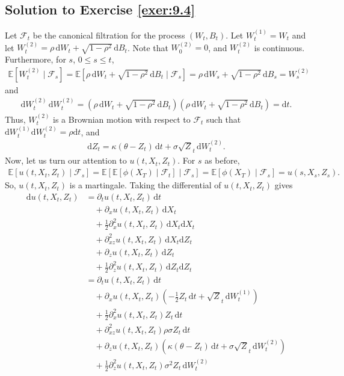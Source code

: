 \documentclass[12pt]{book}
\let\varphi\phi
\numberwithin{equation}{chapter}
\theoremstyle{plain}
\numberwithin{theorem}{section}
\theoremstyle{definition}
\numberwithin{exercise}{chapter}
\newcommand{\<}{\langle}
\renewcommand{\>}{\rangle}
\renewcommand{\(}{\left(}
\renewcommand{\)}{\right)}
\renewcommand{\[}{\left[}
\renewcommand{\]}{\right]}
\newcommand\Eb{\mathds{E}}
\newcommand\Fc{\mathscr{F}}
\newcommand\sig{\sigma}
\renewcommand\d{\partial}
\newcommand\dd{\mathrm{d}}
\newcommand\half{\frac{1}{2}}
\begin{document}
\subsection*{Solution to Exercise \ref{exer:9.4}}
Let $\Fc_t$ be the canonical filtration for the process $(W_t, B_t)$. Let $W_t^{(1)} = W_t$ and let $W_t^{(2)} = \rho \, \dd W_t + \sqrt{ 1 - \rho^2}\, \dd B_t$. Note that $W_0^{(2)} =0$, and $W_t^{(2)}$ is continuous. Furthermore, for $s$, $0 \leq s \leq t$, 
\begin{align}
\Eb[ W_t^{(2)} \mid \Fc_s]
	= \Eb[ \rho \, \dd W_t + \sqrt{ 1 - \rho^2}\, \dd B_t \mid \Fc_s]
	= \rho \, \dd W_s + \sqrt{ 1 - \rho^2}\, \dd B_s
	= W_s^{(2)}
\end{align}
and
\begin{align}
\dd W_t^{(2)}\, \dd W_t^{(2)}
	= \( \rho \, \dd W_t + \sqrt{ 1 - \rho^2}\, \dd B_t \) \(\rho \, \dd W_t + \sqrt{ 1 - \rho^2}\, \dd B_t\)
	= \dd t.
\end{align}
Thus, $W_t^{(2)}$ is a Brownian motion with respect to $\Fc_t$ such that $\dd W_t^{(1)}\dd W_t^{(2)} = \rho\dd t$, and 
\begin{align}
\dd Z_t
	= \kappa (\theta - Z_t)\, \dd t
	+ \sig \sqrt Z_t\, \dd W_t^{(2)}.
\end{align}
Now, let us turn our attention to $u(t,X_t,Z_t)$. For $s$ as before,
\begin{align}
\Eb[ u(t,X_t,Z_t) \mid \Fc_s]
	= \Eb[ \Eb[ \varphi(X_T) \mid \Fc_t] \mid \Fc_s]
	= \Eb[\varphi(X_T) \mid \Fc_s]
	= u(s,X_s,Z_s).
\end{align}
So, $u(t,X_t,Z_t)$ is a martingale. Taking the differential of $u(t,X_t, Z_t)$ gives
\begin{align}
\dd u(t,X_t, Z_t)
	&= \d_t u(t,X_t, Z_t)\, \dd t \\ &\quad
	  + \d_x u(t,X_t, Z_t)\, \dd X_t \\ &\quad
	  + \half \d_{x}^2 u(t,X_t, Z_t)\, \dd X_t \dd X_t \\ &\quad 
	  + \d_{xz}^2 u(t,X_t, Z_t)\, \dd X_t \dd Z_t \\ & \quad
	  + \d_z u(t,X_t, Z_t)\, \dd Z_t \\ & \quad
	  + \half \d_{z}^2 u(t,X_t, Z_t)\, \dd Z_t \dd Z_t \\
	&= \d_t u(t,X_t, Z_t)\, \dd t \\ &\quad
	  + \d_x u(t,X_t, Z_t)\( -\half Z_t \, \dd t + \sqrt Z_t\, \dd W_t^{(1)}\) \\ &\quad
	  + \half \d_{x}^2 u(t,X_t, Z_t) Z_t\, \dd t \\ &\quad 
	  + \d_{xz}^2 u(t,X_t, Z_t) \rho \sig Z_t\, \dd t \\ & \quad
	  + \d_z u(t,X_t, Z_t)\( \kappa (\theta - Z_t)\, \dd t + \sig \sqrt Z_t \, \dd W_t^{(2)}\) \\ & \quad
	  + \half \d_{z}^2 u(t,X_t, Z_t)\sig^2 Z_t\, \dd W_t^{(2)} \\
\end{align}
\end{document}
